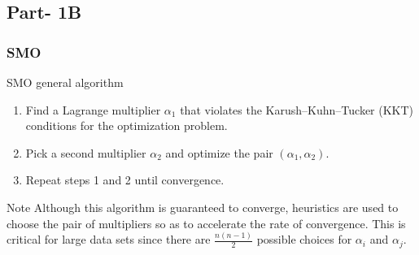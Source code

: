 \documentclass[12pt,t]{beamer}
\begin{document}
\subsection{Part- 1B}
\begin{frame}
    \frametitle{SMO}

    \begin{block}{SMO general algorithm}
        \begin{enumerate}
            \item Find a Lagrange multiplier $\alpha_{1}$ that violates the Karush–Kuhn–Tucker (KKT) conditions for the optimization problem.
            \item Pick a second multiplier $\alpha_{2}$ and optimize the pair $(\alpha_{1},\alpha_{2})$.
            \item Repeat steps 1 and 2 until convergence.
        \end{enumerate}
    \end{block}

    \begin{block}{Note}
        Although this algorithm is guaranteed to converge, heuristics are used to choose
         the pair of multipliers so as to accelerate the rate of convergence.
         This is critical for large data sets since there are 
         $\frac{n(n-1)}{2}$ possible choices for $\alpha_{i}$ and 
         $\alpha_{j}$.
    \end{block}
    

\end{frame}
\end{document}
